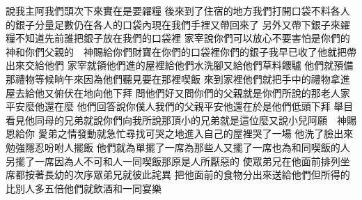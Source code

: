 說\chientien 我主阿\chientien 我們頭次下來實在是要糴糧\chuan 
{}後來到了住宿的地方\chientien 我們打開口袋\chientien 不料各人的銀子分量足數\chientien 仍在各人的口袋內\chientien 現在我們手裡又帶回來了\chuan 
{}另外又帶下銀子來糴糧\chientien 不知道先前誰把銀子放在我們的口袋裡\chuan 
{}家宰說\chientien 你們可以放心\chientien 不要害怕\chientien 是你們的　神\chientien 和你們父親的　神\chientien 賜給你們財寶在你們的口袋裡\yuentien 你們的銀子我早已收了\yuentien 他就把帶出來交給他們\chuan 
{}家宰就領他們進的屋裡\chientien 給他們水洗腳\chientien 又給他們草料餵驢\chuan 
{}他們就預備那禮物\chientien 等候晌午來\chientien 因為他們聽見要在那裡喫飯\chuan\Chuan
{}來到家裡\chientien 他們就把手中的禮物拿進屋去給他\chientien 又俯伏在地向他下拜\chuan 
{}問他們好\chientien 又問\chientien 你們的父親\chientien 就是你們所說的那老人家平安麼\yuentien 他還在麼\chuan 
{}他們回答說\chientien 你僕人我們的父親平安\chientien 他還在\yuentien 於是他們低頭下拜\chuan 
{}舉目看見他同母的兄弟\chientien 就說\chientien 你們向我所說那頂小的兄弟\chientien 就是這位麼\yuentien 又說\chientien 小兒阿\chientien 願　神賜恩給你\chuan 
{}愛弟之情發動\chientien 就急忙尋找可哭之地\chientien 進入自己的屋裡\chientien 哭了一場\chuan 
{}他洗了臉出來\chientien 勉強隱忍\chientien 吩咐人擺飯\chuan 
{}他們就為單擺了一席\chientien 為那些人又擺了一席\chientien 也為和同喫飯的人另擺了一席\yuentien 因為人不可和人一同喫飯\yuentien 那原是人所厭惡的\chuan 
{}使眾弟兄在他面前排列坐席\chientien 都按著長幼的次序\yuentien 眾弟兄就彼此詫異\chuan 
{}把他面前的食物分出來\chientien 送給他們\yuentien 但所得的\chientien 比別人多五倍\yuentien 他們就飲酒\chientien 和一同宴樂\chuan 
